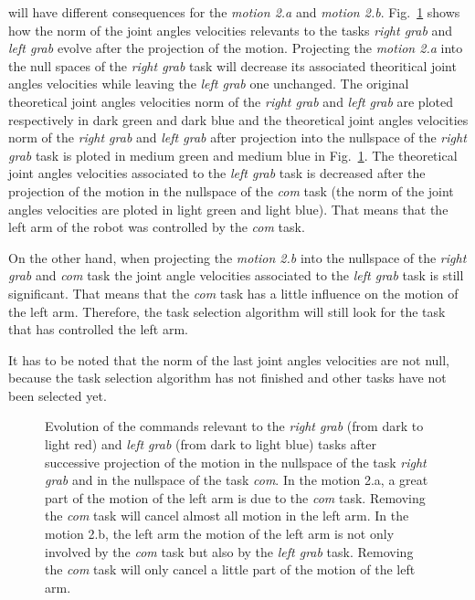 \documentclass[letterpaper, 10pt, conference]{ieeeconf}      %
\begin{document}
will have different consequences for the \emph{motion 2.a} and \emph{motion 2.b}.
Fig.~\ref{fig:RbeforeAfterProj} shows how the norm of the joint angles velocities relevants to the tasks
\emph{right grab} and \emph{left grab} evolve after the projection of the motion.
Projecting the \emph{motion 2.a} into the null spaces of
the \emph{right grab} task will decrease its associated theoritical joint angles velocities while leaving the
\emph{left grab} one unchanged. The original theoretical joint angles velocities norm of the \emph{right grab}
and \emph{left grab} are ploted respectively in dark green and dark blue and
the theoretical joint angles velocities norm of the \emph{right grab} and \emph{left grab} after projection
into the nullspace of the \emph{right grab} task is ploted in medium green and medium blue
in Fig.~\ref{fig:RbeforeAfterProj}. The theoretical joint angles velocities associated to the 
\emph{left grab} task is decreased after the projection of the motion in
the nullspace of the \emph{com} task (the norm of the joint angles velocities are ploted in light green and light blue).
That means that the left arm of the robot was controlled by the \emph{com} task.

On the other hand, when projecting the \emph{motion 2.b} into the nullspace of the \emph{right grab}
and \emph{com} task the joint angle velocities associated to the \emph{left grab} task
is still significant. That means that the \emph{com} task has a little influence on the
motion of the left arm. Therefore, the task selection algorithm will still look
for the task that has controlled the left arm.

It has to be noted that the norm of the last joint angles velocities are not null, because 
the task selection algorithm has not finished and other tasks have not been selected yet.
\begin{figure}[t]
\centering
  \subfigure[Motion 2.a]{
  \resizebox{.48\textwidth}{!} {
      
    }
  \label{fig:RbeforeAfterProj:2a}
  }
  \subfigure[Motion 2.b]{
  \resizebox{.48\textwidth}{!} {
      
  }
  \label{fig:RbeforeAfterProj:2b}
  }
  \caption{Evolution of the commands relevant to the \emph{right grab} (from dark to light red) and 
  \emph{left grab} (from dark to light blue) tasks after
  successive projection of the motion in the nullspace of the task \emph{right grab} and in the nullspace
  of the task \emph{com}. In the motion 2.a, a great part of the motion of the left arm is due to the \emph{com} task.
  Removing the \emph{com} task will cancel almost all motion in the left arm.
  In the motion 2.b, the left arm the motion of the left arm is not only involved by the \emph{com} task
  but also by the \emph{left grab} task. Removing the \emph{com} task will only
  cancel a little part of the motion of the left arm.}
\label{fig:RbeforeAfterProj}
\end{figure}
\end{document}
